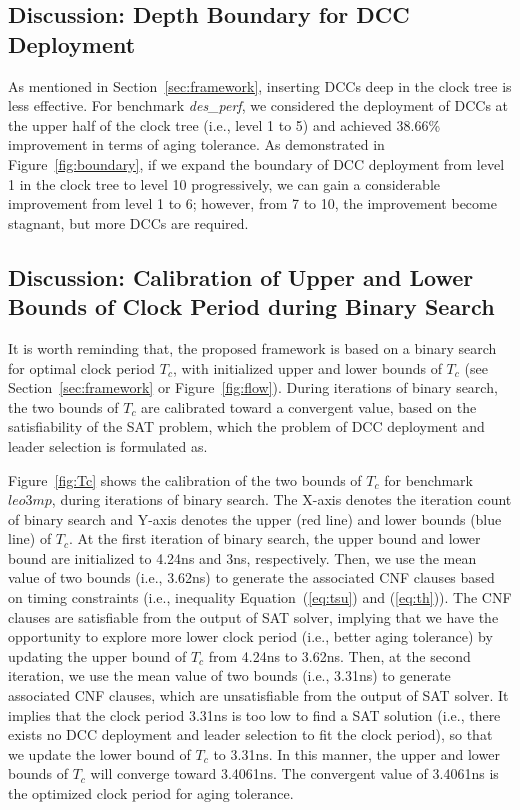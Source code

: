 \subsection{Discussion: Depth Boundary for DCC Deployment}

As mentioned in Section~\ref{sec:framework}, inserting DCCs deep in the clock tree is less effective. For benchmark \textit{des\_perf}, we considered the deployment of DCCs at the upper half of the clock tree (i.e., level 1 to 5) and achieved 38.66\% improvement in terms of aging tolerance. As demonstrated in Figure~\ref{fig:boundary}, if we expand the boundary of DCC deployment from level 1 in the clock tree to level 10 progressively, we can gain a considerable improvement from level 1 to 6; however, from 7 to 10, the improvement become stagnant, but more DCCs are required.

\subsection{Discussion: Calibration of Upper and Lower Bounds of Clock Period during Binary Search}

It is worth reminding that, the proposed framework is based on a binary search for optimal clock period $T_{c}$, with initialized upper and lower bounds of $T_{c}$ (see Section~\ref{sec:framework} or Figure~\ref{fig:flow}). During iterations of binary search, the two bounds of $T_{c}$ are calibrated toward a convergent value, based on the satisfiability of the SAT problem, which the problem of DCC deployment and leader selection is formulated as.

Figure~\ref{fig:Tc} shows the calibration of the two bounds of $T_{c}$ for benchmark $leo3mp$, during iterations of binary search. The X-axis denotes the iteration count of binary search and Y-axis denotes the upper (red line) and lower bounds (blue line) of $T_{c}$. At the first iteration of binary search, the upper bound and lower bound are initialized to 4.24ns and 3ns, respectively. Then, we use the mean value of two bounds (i.e., 3.62ns) to generate the associated CNF clauses based on timing constraints (i.e., inequality Equation~(\ref{eq:tsu}) and (\ref{eq:th})). The CNF clauses are satisfiable from the output of SAT solver, implying that we have the opportunity to explore more lower clock period (i.e., better aging tolerance) by updating the upper bound of $T_{c}$ from 4.24ns to 3.62ns. Then, at the second iteration, we use the mean value of two bounds (i.e., 3.31ns) to generate associated CNF clauses, which are unsatisfiable from the output of SAT solver. It implies that the clock period 3.31ns is too low to find a SAT solution (i.e., there exists no DCC deployment and leader selection to fit the clock period), so that we update the lower bound of $T_{c}$ to 3.31ns. In this manner, the upper and lower bounds of $T_{c}$ will converge toward 3.4061ns. The convergent value of 3.4061ns is the optimized clock period for aging tolerance.

